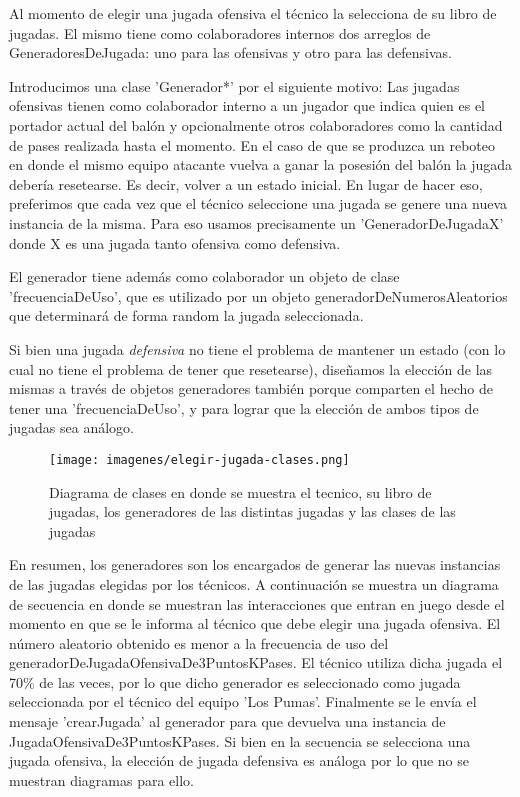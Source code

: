 Al momento de elegir una jugada ofensiva el técnico la selecciona de su libro de jugadas. El mismo tiene como colaboradores internos dos arreglos de 
GeneradoresDeJugada: uno para las ofensivas y otro para las defensivas. 

Introducimos una clase 'Generador*' por el siguiente motivo:
Las jugadas ofensivas tienen como colaborador interno a un jugador que indica quien es el portador actual del balón y opcionalmente otros colaboradores como la
cantidad de pases realizada hasta el momento. En el caso de que se produzca un reboteo en donde el mismo equipo 
atacante vuelva a ganar la posesión del balón la jugada debería resetearse. Es decir, volver a un estado inicial. 
En lugar de hacer eso, preferimos que cada vez que el técnico seleccione una jugada se genere una nueva instancia de la misma.
Para eso usamos precisamente un 'GeneradorDeJugadaX' donde X es una jugada tanto ofensiva como defensiva.

El generador tiene además como colaborador un objeto de clase 'frecuenciaDeUso', que es utilizado por un objeto generadorDeNumerosAleatorios que determinará 
de forma random la jugada seleccionada.

Si bien una jugada \emph{defensiva} no tiene el problema de mantener un estado (con lo cual no tiene el problema de tener que resetearse),
diseñamos la elección de las mismas a través de objetos generadores también porque comparten el hecho de tener una 'frecuenciaDeUso', y para lograr que la elección
de ambos tipos de jugadas sea análogo.

\begin{figure}[h!]
   \texttt{[image: imagenes/elegir-jugada-clases.png]}
   \caption{Diagrama de clases en donde se muestra el tecnico, su libro de jugadas, los generadores de las distintas jugadas y las clases de las jugadas}
\end{figure}

En resumen, los generadores son los encargados de generar las nuevas instancias de las jugadas elegidas por los técnicos. A continuación se muestra un diagrama
de secuencia en donde se muestran las interacciones que entran en juego desde el momento en que se le informa al técnico que debe elegir una jugada ofensiva.
El número aleatorio obtenido es menor a la frecuencia de uso del generadorDeJugadaOfensivaDe3PuntosKPases. El técnico utiliza dicha jugada el 70\% de las veces,
por lo que dicho generador es seleccionado
como jugada seleccionada por el técnico del equipo 'Los Pumas'. Finalmente se le envía el mensaje 'crearJugada' al generador para que devuelva una instancia
de JugadaOfensivaDe3PuntosKPases.
Si bien en la secuencia se selecciona una jugada ofensiva, la elección de jugada defensiva es análoga por lo que no se muestran diagramas para ello.

